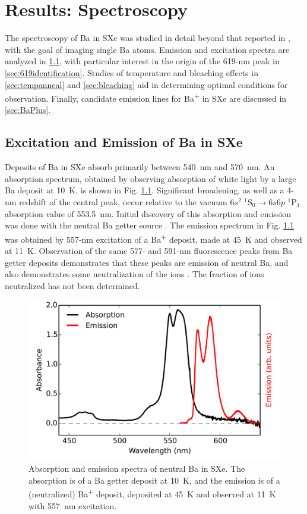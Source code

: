 \chapter{Results: Spectroscopy}

The spectroscopy of Ba in SXe was studied in detail beyond that reported in \cite{Shon,Brian}, with the goal of imaging single Ba atoms.  Emission and excitation spectra are analyzed in \ref{sec:fluorescence}, with particular interest in the origin of the 619-nm peak in \ref{sec:619identification}.  Studies of temperature and bleaching effects in \ref{sec:tempanneal} and \ref{sec:bleaching} aid in determining optimal conditions for observation.  Finally, candidate emission lines for Ba\textsuperscript{+} in SXe are discussed in \ref{sec:BaPlus}.


\section{Excitation and Emission of Ba in SXe}
\label{sec:fluorescence}

Deposits of Ba in SXe absorb primarily between 540~nm and 570~nm.  An absorption spectrum, obtained by observing absorption of white light by a large Ba deposit at 10~K, is shown in Fig. \ref{fig:BaAbs}.  Significant broadening, as well as a 4-nm redshift  of the central peak, occur relative to the vacuum $6s^{2}$ $^{1}$S$_{0} \rightarrow 6s6p$ $^{1}$P$_{1}$ absorption value of 553.5~nm.  Initial discovery of this absorption and emission was done with the neutral Ba getter source \cite{Mong2015,Shon,Brian}.  The emission spectrum in Fig. \ref{fig:BaAbs} was obtained by 557-nm excitation of a Ba\textsuperscript{+} deposit, made at 45~K and observed at 11~K.  Observation of the same 577- and 591-nm fluorescence peaks from Ba getter deposits demonstrates that these peaks are emission of neutral Ba, and also demonstrates some neutralization of the ions \cite{Mong2015,Shon,Brian}.  The fraction of ions neutralized has not been determined.

\begin{figure} %
        \centering
                \includegraphics[width=.7\textwidth]{figures/BaAbs_fromBaSpec.png}
                \caption{Absorption and emission spectra of neutral Ba in SXe.  The absorption is of a Ba getter deposit at 10~K, and the emission is of a (neutralized) Ba\textsuperscript{+} deposit, deposited at 45~K and observed at 11~K with 557~nm excitation.\cite{Mong2015}}
\label{fig:BaAbs}
\end{figure}

